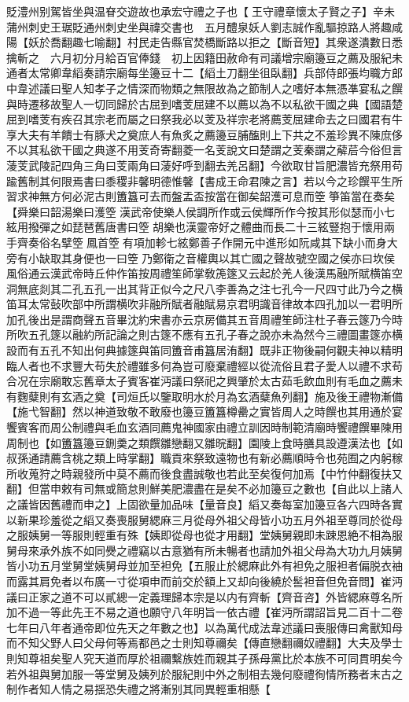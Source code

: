 貶澧州别駕皆坐與温眘交遊故也承宏守禮之子也【王守禮章懷太子賢之子】辛未蒲州刺史王琚貶通州刺史坐與禕交書也　五月醴泉妖人劉志誠作亂驅掠路人將趣咸陽【妖於喬翻趣七喻翻】村民走告縣官焚橋斷路以拒之【斷音短】其衆遂潰數日悉擒斬之　六月初分月給百官俸錢　初上因籍田赦命有司議增宗廟籩豆之薦及服紀未通者太常卿韋縚奏請宗廟每坐籩豆十二【縚土刀翻坐徂臥翻】兵部侍郎張均職方郎中韋述議曰聖人知孝子之情深而物類之無限故為之節制人之嗜好本無憑凖宴私之饌與時遷移故聖人一切同歸於古屈到嗜芰屈建不以薦以為不以私欲干國之典【國語楚屈到嗜芰有疾召其宗老而屬之曰祭我必以芰及祥宗老將薦芰屈建命去之曰國君有牛享大夫有羊饋士有豚犬之奠庶人有魚炙之薦籩豆脯醢則上下共之不羞珍異不陳庶侈不以其私欲干國之典遂不用芰奇寄翻菱一名芰說文曰楚謂之芰秦謂之薢茩今俗但言蓤芰武陵記四角三角曰芰兩角曰蓤好呼到翻去羌呂翻】今欲取甘旨肥濃皆充祭用苟踰舊制其何限焉書曰黍稷非馨明德惟馨【書成王命君陳之言】若以今之珍饌平生所習求神無方何必泥古則簠簋可去而盤盂盃按當在御矣韶濩可息而箜箏笛當在奏矣【舜樂曰韶湯樂曰濩箜漢武帝使樂人侯調所作或云侯輝所作今按其形似瑟而小七絃用撥彈之如琵琶舊唐書曰箜胡樂也漢靈帝好之體曲而長二十三絃豎抱于懷用兩手齊奏俗名擘箜鳳首箜有項加軫七絃鄭善子作開元中進形如阮咸其下缺小而身大旁有小缺取其身便也一曰箜乃鄭衛之音權輿以其亡國之聲故號空國之侯亦曰坎侯風俗通云漢武帝時丘仲作笛按周禮笙師掌敎箎篴又云起於羌人後漢馬融所賦横笛空洞無底剡其二孔五孔一出其背正似今之尺八李善為之注七孔今一尺四寸此乃今之横笛耳太常鼔吹部中所謂横吹非融所賦者融賦易京君明識音律故本四孔加以一君明所加孔後出是謂商聲五音畢沈約宋書亦云京房備其五音周禮笙師注杜子春云篴乃今時所吹五孔篴以融約所記論之則古篴不應有五孔子春之說亦未為然今三禮圖畫篴亦横設而有五孔不知出何典據篴與笛同簠音甫簋居洧翻】既非正物後嗣何觀夫神以精明臨人者也不求豐大苟失於禮雖多何為豈可廢棄禮經以從流俗且君子愛人以禮不求苟合况在宗廟敢忘舊章太子賓客崔沔議曰祭祀之興肇於太古茹毛飲血則有毛血之薦未有麴糵則有玄酒之奠【司烜氏以鑒取明水於月為玄酒糵魚列翻】施及後王禮物漸備【施弋智翻】然以神道致敬不敢廢也籩豆簠簋樽罍之實皆周人之時饌也其用通於宴饗賓客而周公制禮與毛血玄酒同薦鬼神國家由禮立訓因時制範清廟時饗禮饌畢陳用周制也【如簠簋籩豆鉶羮之類饌雛戀翻又雛晥翻】園陵上食時膳具設遵漢法也【如叔孫通請薦含桃之類上時掌翻】職貢來祭致遠物也有新必薦順時令也苑囿之内躬稼所收蒐狩之時親發所中莫不薦而後食盡誠敬也若此至矣復何加焉【中竹仲翻復扶又翻】但當申敕有司無或簡怠則鮮美肥濃盡在是矣不必加籩豆之數也【自此以上諸人之議皆因舊禮而申之】上固欲量加品味【量音良】縚又奏每室加籩豆各六四時各實以新果珍羞從之縚又奏喪服舅緦麻三月從母外祖父母皆小功五月外祖至尊同於從母之服姨舅一等服則輕重有殊【姨即從母也從才用翻】堂姨舅親即未踈恩絶不相為服舅母來承外族不如同㸑之禮竊以古意猶有所未暢者也請加外祖父母為大功九月姨舅皆小功五月堂舅堂姨舅母並加至袒免【五服止於緦麻此外有袒免之服袒者偏脱衣䄂而露其肩免者以布廣一寸從項申而前交於額上又却向後繞於䯻袒音但免音問】崔沔議曰正家之道不可以貳總一定義理歸本宗是以内有齊斬【齊音咨】外皆緦麻尊名所加不過一等此先王不易之道也願守八年明旨一依古禮【崔沔所謂詔旨見二百十二卷七年曰八年者通帝即位先天之年數之也】以為萬代成法韋述議曰喪服傳曰禽獸知母而不知父野人曰父母何等焉都邑之士則知尊禰矣【傳直戀翻禰奴禮翻】大夫及學士則知尊祖矣聖人究天道而厚於祖禰繫族姓而親其子孫母黨比於本族不可同貫明矣今若外祖與舅加服一等堂舅及姨列於服紀則中外之制相去幾何廢禮徇情所務者末古之制作者知人情之易揺恐失禮之將漸别其同異輕重相懸【